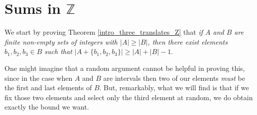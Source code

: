 \documentclass[12pt,reqno]{amsart}
\newtheorem{theorem}{Theorem}
\theoremstyle{definition}
\renewcommand\leq{\leqslant}
\renewcommand\ge{\geqslant}
\begin{document}
%


%



\section{Sums in ${\mathbb Z}$}


\vspace{7pt}
\noindent
We start by proving Theorem \ref{intro_three_translates_Z} that {\em if $A$ and $B$ are finite non-empty sets of
integers with $|A| \ge |B|$, then there exist elements
$b_1,b_2,b_3 \in B$ such that $|A+\{b_1, b_2,b_3\}| \ge |A|+|B|-1.$}



\vspace{5pt}
One might imagine that a random argument cannot
be helpful in proving this, since in the case when $A$ and $B$ are intervals then two of our elements {\em must} be the
first and last elements of $B$. But, remarkably, what we will find is that if we fix those two elements and select only the third element at random, we do obtain exactly the bound we want.
\end{document}
